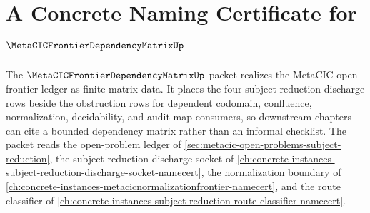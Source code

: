 \chapter{A Concrete Naming Certificate for $\MetaCICFrontierDependencyMatrixUp$}
\label{ch:concrete-instances-metacic-frontier-dependency-matrix-namecert}

The $\MetaCICFrontierDependencyMatrixUp$ packet realizes the MetaCIC open-frontier ledger as finite matrix data. It places the four subject-reduction discharge rows beside the obstruction rows for dependent codomain, confluence, normalization, decidability, and audit-map consumers, so downstream chapters can cite a bounded dependency matrix rather than an informal checklist. The packet reads the open-problem ledger of \autoref{sec:metacic-open-problems-subject-reduction}, the subject-reduction discharge socket of \autoref{ch:concrete-instances-subject-reduction-discharge-socket-namecert}, the normalization boundary of \autoref{ch:concrete-instances-metacicnormalizationfrontier-namecert}, and the route classifier of \autoref{ch:concrete-instances-subject-reduction-route-classifier-namecert}.



